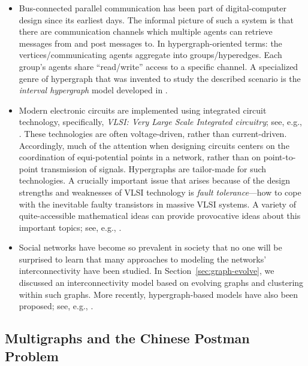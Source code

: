 \begin{itemize}
\item
Bus-connected parallel communication has been part of digital-computer design since
its earliest days.  The informal picture of such a system is that there are communication 
channels which multiple agents can retrieve messages from and post messages to.  In
hypergraph-oriented terms: the vertices/communicating agents aggregate into 
groups/hyperedges.  Each group's agents share ``read/write'' access to a specific channel.  A
specialized genre of hypergraph that was invented to study the described scenario is the 
{\it interval hypergraph}  model developed in \cite{Rosenberg89a}.

\item
Modern electronic circuits are implemented using integrated circuit technology, specifically, {\em VLSI: Very Large Scale Integrated circuitry}; see, e.g., \cite{Mead-Conway}.  These technologies are often voltage-driven, rather than current-driven.  Accordingly, much of the attention when designing circuits centers on the coordination of equi-potential points in a network, rather than on point-to-point transmission of signals.  Hypergraphs are tailor-made for such technologies.  A crucially important issue that arises because of the design strengths and weaknesses of VLSI 
technology is {\it fault tolerance}---how to cope with the inevitable faulty transistors in massive VLSI systems.  A variety of quite-accessible mathematical ideas can provide provocative ideas about this important topics; see, e.g., \cite{Rosenberg85a}.

\item
Social networks have become so prevalent in society that no one will be surprised to learn that many approaches to modeling the networks' interconnectivity have been studied.  In
Section~\ref{sec:graph-evolve}, we discussed an interconnectivity model based on evolving graphs and clustering within such graphs.  More recently, hypergraph-based models have also been proposed; see, e.g., \cite{Amatoetal17,LiuBV10}.
\end{itemize}

\subsection{Multigraphs and the Chinese Postman Problem}
\label{sec:multigraphs}

